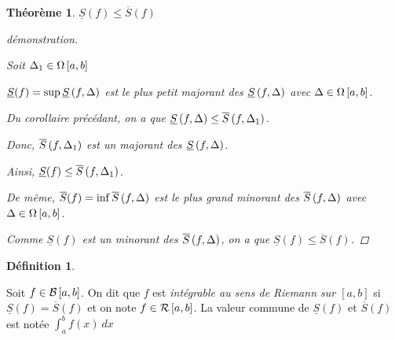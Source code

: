 \documentclass{report}
\newcommand*{\Ssup}[1]{\overline{S}(#1)}
\newcommand*{\Sinf}[1]{\underline{S}(#1)}
\newtheorem*{thm}{Th\'eor\`eme}
\theoremstyle{definition}
\newtheorem*{defin}{D\'efinition}
\theoremstyle{remark}
\begin{document}
	\begin{thm}
		$\Sinf{f} \leq \Ssup{f}$
		\begin{proof}[d\'emonstration]~

			Soit $\Delta_1 \in \partitions$

			$\Sinf{f}=\sup\sinf{f}$ est le plus petit majorant des $\sinf{f}$ avec $\Delta \in \partitions$.

			Du corollaire pr\'ec\'edant, on a que $\sinf{f} \leq \ssup{f}[\Delta_1]$.

			Donc, $\ssup{f}[\Delta_1]$ est un majorant des $\sinf{f}$.

			Ainsi, $\Sinf{f} \leq \ssup{f}[\Delta_1]$.

			De m\^eme, $\Ssup{f}=\inf\ssup{f}$ est le plus grand minorant des $\ssup{f}$ avec $\Delta \in \partitions$.

			Comme $\Sinf{f}$ est un minorant des $\ssup{f}$, on a que $\Sinf{f} \leq \Ssup{f}$.
		\end{proof}
	\end{thm}

	\begin{defin}
		~

		Soit $f \in \bornee$. On dit que $f$ est \emph{int\'egrable au sens de Riemann sur $[a,b]$} si $\Sinf{f}=\Ssup{f}$ et on note $f \in \riemann$. La valeur commune de $\Sinf{f}$ et $\Ssup{f}$ est not\'ee $\int_{a}^{b}f(x)\ dx$
	\end{defin}
\end{document}
